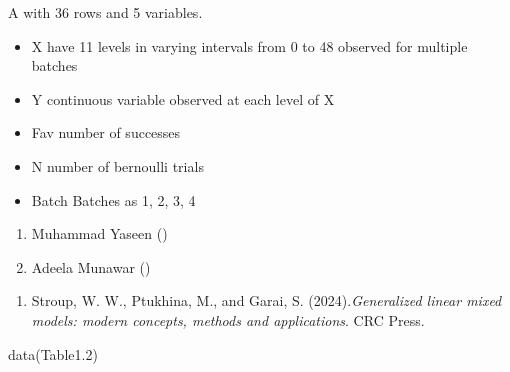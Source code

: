 \documentclass[a4paper]{book}
\begin{document}
%
\begin{Format}
A  with 36 rows and 5 variables.
\end{Format}
%
\begin{Details}
\begin{itemize}

\item{} X     have 11 levels in varying intervals from 0 to 48 observed for multiple batches
\item{} Y     continuous variable observed at each level of X
\item{} Fav   number of successes
\item{} N     number of bernoulli trials
\item{} Batch Batches as 1, 2, 3, 4

\end{itemize}

\end{Details}
%
\begin{Author}
\begin{enumerate}

\item{}  Muhammad Yaseen ()
\item{} Adeela Munawar ()

\end{enumerate}

\end{Author}
%
\begin{References}
\begin{enumerate}

\item{} Stroup, W. W., Ptukhina, M., and Garai, S. (2024).\emph{Generalized linear mixed models: modern concepts, methods and applications}.
CRC Press.

\end{enumerate}

\end{References}
%
\begin{SeeAlso}
\end{SeeAlso}
%
\begin{Examples}
\begin{ExampleCode}
data(Table1.2)
\end{ExampleCode}
\end{Examples}
\printindex{}
\end{document}
